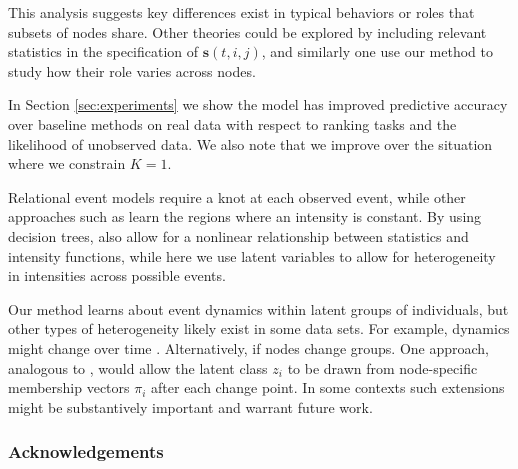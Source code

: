 \documentclass{article}
\begin{document}
This analysis suggests key differences exist in typical behaviors or roles that subsets of nodes share.  Other theories could be explored by including relevant statistics in the specification of $\mathbf{s}(t,i,j)$, and similarly one use our method to study how their role varies across nodes.

In Section \ref{sec:experiments} we show the model has improved predictive accuracy over baseline methods on real data with respect to ranking tasks and the likelihood of unobserved data.  We also note that we improve over the situation where we constrain $K=1$.

Relational event models \cite{Butts2008} require a knot at each observed event, while other approaches such as \cite{Gunawardana2011} learn the regions where an intensity is constant.  By using decision trees,  \cite{Gunawardana2011} also allow for a nonlinear relationship between statistics and intensity functions, while here we use latent variables to allow for heterogeneity in intensities across possible events.

Our method learns about event dynamics within latent groups of individuals, but other types of heterogeneity likely exist in some data sets.  For example, dynamics might change over time \cite{Vu2011}.  Alternatively, if nodes change groups.  One approach, analogous to \cite{Airoldi2008}, would allow the latent class $z_i$ to be drawn from node-specific membership vectors $\pi_i$  after each change point.  In some contexts such extensions might be substantively important and warrant future work.

\subsubsection*{Acknowledgements}



\end{document}
